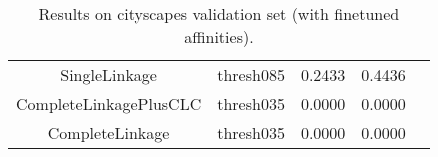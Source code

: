 \begin{table*}
\begin{subtable}[t!]{0.98\textwidth}
\begin{tabular}{c| c| c | c | c}
SingleLinkage & thresh085 & {\color{Red} 0.2433 } & {\color{Red} 0.4436 } \\
CompleteLinkagePlusCLC & thresh035  & {\color{Red} 0.0000 } & {\color{Red} 0.0000 } \\
CompleteLinkage & thresh035  & {\color{Red} 0.0000 } & {\color{Red} 0.0000 } \\


        \end{tabular}
    \end{subtable} 
    \caption{Results on cityscapes validation set (with finetuned affinities). }
    \label{tab:linkage-criteria}
\end{table*}


